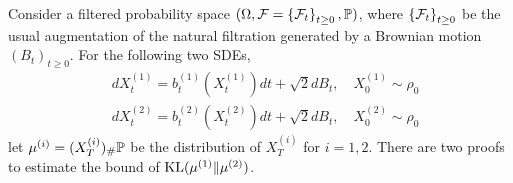\documentclass[a4paper,12pt]{article}
\begin{document}
Consider a filtered probability space $(\Omega, \mathcal{F}=\left\{\mathcal{F}_t\right\}_{t \geq 0}, \mathbb{P})$, where $\left\{\mathcal{F}_t\right\}_{t \geq 0}$ be the usual augmentation of the natural filtration generated by a Brownian motion $(B_t)_{t \geq 0}$. For the following two SDEs,
\begin{equation*}
  \begin{aligned}
    & d X_t^{(1)}=b_t^{(1)}(X_t^{(1)}) d t+\sqrt{2} d B_t,\quad X_0^{(1)} \sim \rho_0\\
    & d X_t^{(2)}=b_t^{(2)}(X_t^{(2)}) d t+\sqrt{2} d B_t,\quad X_0^{(2)} \sim \rho_0
  \end{aligned}
\end{equation*}
let $\mu^{(i)} = (X_T^{(i)})_{\#}\mathbb{P}$ be the distribution of $X_T^{(i)}$ for $i=1,2$. There are two proofs to estimate the bound of $\operatorname{KL}(\mu^{(1)} \Vert \mu^{(2)})$.
\end{document}
